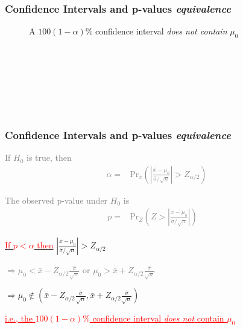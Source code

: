 \documentclass[xcolor={dvipsnames}]{beamer}
\begin{document}
\frame
{
 \frametitle{Confidence Intervals and p-values \emph{equivalence}}

\begin{figure}
\centering
\large
A $100(1-\alpha)\%$ confidence interval \emph{does not contain} $\mu_0$

\vspace{-4em}
\Huge{}
\vspace{-1.5em}
\large

\\${}$\\${}$\\${}$\\




\vspace{-4em}
\Huge{}
\vspace{-1.5em}
\large

\\

\end{figure}
}

\frame
{
 \frametitle{Confidence Intervals and p-values \emph{equivalence}}

\begin{itemize}
\item[]
\textcolor{gray}{If $H_0$ is true, then 
\begin{align*}
\alpha = {} & \text{Pr}_{\bar x}\left(\left\lvert  \frac{\bar x - \mu_0} {\hat \sigma /\sqrt{n}}\right\rvert > Z_{\alpha/2} \right)
\end{align*}
\item[] The observed p-value under $H_0$ is 
\begin{align*}
p = {} & \text{Pr}_Z\left( Z > \left\lvert  \frac{\bar x - \mu_0} {\hat \sigma /\sqrt{n}}\right\rvert \right)\quad
\end{align*}
}
\item<1-> \underline{\textcolor{red}{If $p < \alpha$ then}} $\left\lvert \frac{\bar x - \mu_0} {\hat \sigma /\sqrt{n}}\right\rvert > Z_{\alpha/2} $
\item[]<1-> \textcolor{gray}{$\Longrightarrow \mu_0 < \bar x - Z_{\alpha/2} \frac{\hat \sigma}{\sqrt{n}} \text{ or } 
\mu_0 > \bar x + Z_{\alpha/2} \frac{\hat \sigma}{\sqrt{n}}$}
\item[]<2-> $\Longrightarrow \mu_0 \not \in \left(\bar x - Z_{\alpha/2} \frac{\hat \sigma}{\sqrt{n}}, 
\bar x + Z_{\alpha/2} \frac{\hat \sigma}{\sqrt{n}}\right)$
\item[] 
\item[]<2-> \textcolor{red}{\underline{i.e., the $100(1-\alpha)\%$ confidence interval \emph{does not} contain $\mu_0$}}
\end{itemize}
}
\end{document}
